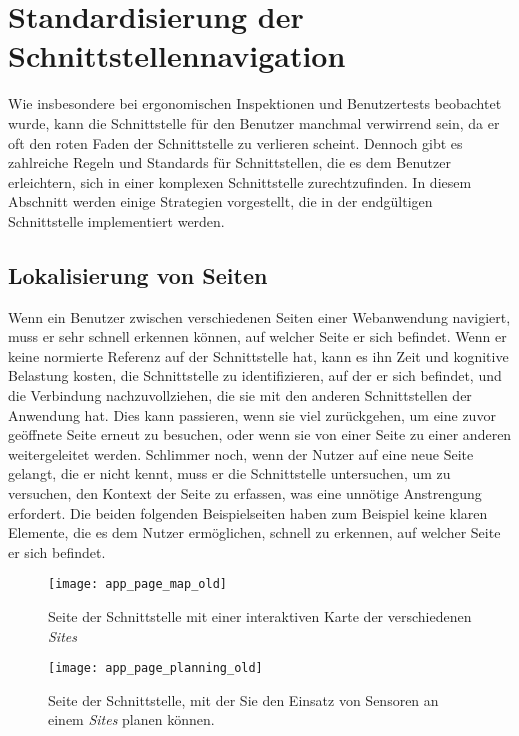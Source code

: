 \section{Standardisierung der Schnittstellennavigation} \label{sec:analyse-navigation}

Wie insbesondere bei ergonomischen Inspektionen und Benutzertests beobachtet wurde, kann die Schnittstelle für den Benutzer manchmal verwirrend sein, da er oft den roten Faden der Schnittstelle zu verlieren scheint.
Dennoch gibt es zahlreiche Regeln und Standards für Schnittstellen, die es dem Benutzer erleichtern, sich in einer komplexen Schnittstelle zurechtzufinden.
In diesem Abschnitt werden einige Strategien vorgestellt, die in der endgültigen Schnittstelle implementiert werden.

\subsection{Lokalisierung von Seiten}

Wenn ein Benutzer zwischen verschiedenen Seiten einer Webanwendung navigiert, muss er sehr schnell erkennen können, auf welcher Seite er sich befindet.
Wenn er keine normierte Referenz auf der Schnittstelle hat, kann es ihn Zeit und kognitive Belastung kosten, die Schnittstelle zu identifizieren, auf der er sich befindet, und die Verbindung nachzuvollziehen, die sie mit den anderen Schnittstellen der Anwendung hat.
Dies kann passieren, wenn sie viel zurückgehen, um eine zuvor geöffnete Seite erneut zu besuchen, oder wenn sie von einer Seite zu einer anderen weitergeleitet werden.
Schlimmer noch, wenn der Nutzer auf eine neue Seite gelangt, die er nicht kennt, muss er die Schnittstelle untersuchen, um zu versuchen, den Kontext der Seite zu erfassen, was eine unnötige Anstrengung erfordert.
Die beiden folgenden Beispielseiten haben zum Beispiel keine klaren Elemente, die es dem Nutzer ermöglichen, schnell zu erkennen, auf welcher Seite er sich befindet.

\begin{figure}[H]
  \centering
  \texttt{[image: app\_page\_map\_old]}
  \caption{Seite der Schnittstelle mit einer interaktiven Karte der verschiedenen \textit{Sites}}
  \label{fig:app_page_map_old}
\end{figure}
\begin{figure}[H]
  \centering
  \texttt{[image: app\_page\_planning\_old]}
  \caption{Seite der Schnittstelle, mit der Sie den Einsatz von Sensoren an einem \textit{Sites} planen können.}
  \label{fig:app_page_planning_old}
\end{figure}

